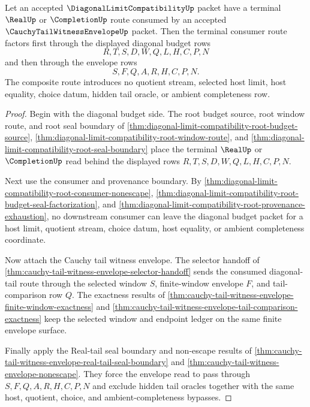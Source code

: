 \begin{theorem}
\label{thm:diagonal-limit-compatibility-cauchy-tail-envelope-factorization}
Let an accepted $\DiagonalLimitCompatibilityUp$ packet have a terminal $\RealUp$ or $\CompletionUp$ route consumed by an accepted $\CauchyTailWitnessEnvelopeUp$ packet. Then the terminal consumer route factors first through the displayed diagonal budget rows
$$
R,T,S,D,W,Q,L,H,C,P,N
$$
and then through the envelope rows
$$
S,F,Q,A,R,H,C,P,N.
$$
The composite route introduces no quotient stream, selected host limit, host equality, choice datum, hidden tail oracle, or ambient completeness row.
\end{theorem}
\begin{proof}
Begin with the diagonal budget side. The root budget source, root window route, and root seal boundary of \autoref{thm:diagonal-limit-compatibility-root-budget-source}, \autoref{thm:diagonal-limit-compatibility-root-window-route}, and \autoref{thm:diagonal-limit-compatibility-root-seal-boundary} place the terminal $\RealUp$ or $\CompletionUp$ read behind the displayed rows $R,T,S,D,W,Q,L,H,C,P,N$.

Next use the consumer and provenance boundary. By \autoref{thm:diagonal-limit-compatibility-root-consumer-nonescape}, \autoref{thm:diagonal-limit-compatibility-root-budget-seal-factorization}, and \autoref{thm:diagonal-limit-compatibility-root-provenance-exhaustion}, no downstream consumer can leave the diagonal budget packet for a host limit, quotient stream, choice datum, host equality, or ambient completeness coordinate.

Now attach the Cauchy tail witness envelope. The selector handoff of \autoref{thm:cauchy-tail-witness-envelope-selector-handoff} sends the consumed diagonal-tail route through the selected window $S$, finite-window envelope $F$, and tail-comparison row $Q$. The exactness results of \autoref{thm:cauchy-tail-witness-envelope-finite-window-exactness} and \autoref{thm:cauchy-tail-witness-envelope-tail-comparison-exactness} keep the selected window and endpoint ledger on the same finite envelope surface.

Finally apply the Real-tail seal boundary and non-escape results of \autoref{thm:cauchy-tail-witness-envelope-real-tail-seal-boundary} and \autoref{thm:cauchy-tail-witness-envelope-nonescape}. They force the envelope read to pass through $S,F,Q,A,R,H,C,P,N$ and exclude hidden tail oracles together with the same host, quotient, choice, and ambient-completeness bypasses.
\end{proof}

